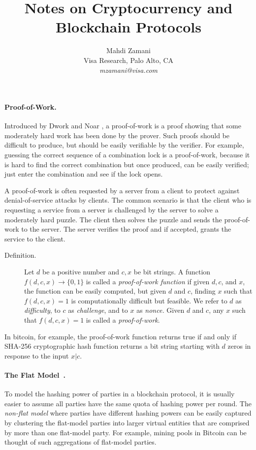 \documentclass[11pt]{article}
\theoremstyle{mytheoremstyle}
\begin{document}
\title{Notes on Cryptocurrency and Blockchain Protocols}

\author{Mahdi Zamani\\ Visa Research, Palo Alto, CA \\ \textit{mzamani@visa.com}}
\date{}

\maketitle

\paragraph{Proof-of-Work.} Introduced by Dwork and Noar \cite{dwork1993}, a proof-of-work is
a proof showing that some moderately hard work has been done by the
prover. Such proofs should be difficult to produce, but should be
easily verifiable by the verifier. For example, guessing the correct
sequence of a combination lock is a proof-of-work, because it is hard
to find the correct combination but once produced, can be easily verified;
just enter the combination and see if the lock opens.

A proof-of-work is often requested by a server from a client to protect
against denial-of-service attacks by clients. The common scenario
is that the client who is requesting a service from a server is challenged
by the server to solve a moderately hard puzzle. The client then solves
the puzzle and sends the proof-of-work to the server. The server verifies
the proof and if accepted, grants the service to the client.
\begin{description}
	\item [{Definition.}] Let $d$ be a positive number and $c,x$ be bit strings.
	A function $f(d,c,x)\to\{0,1\}$ is called a \emph{proof-of-work function}
	if given $d,c$, and $x$, the function can be easily computed, but
	given $d$ and $c$, finding $x$ such that $f(d,c,x)=1$ is computationally
	difficult but feasible. We refer to $d$ as \emph{difficulty}, to
	$c$ as \emph{challenge}, and to $x$ as \emph{nonce.} Given $d$
	and $c$, any $x$ such that $f(d,c,x)=1$ is called a \emph{proof-of-work}.
\end{description}
In bitcoin, for example, the proof-of-work function returns true if
and only if SHA-256 cryptographic hash function returns a bit string
starting with $d$ zeros in response to the input $x|c$.

\paragraph{The Flat Model~\cite{garay2015bitcoin}.} To model the hashing power of parties in a blockchain protocol, it is usually easier to assume all parties have the same quota of hashing power per round. The \emph{non-flat model} where parties have different hashing powers can be easily captured by clustering the flat-model parties into larger virtual entities that are comprised by more than one flat-model party. For example, mining pools in Bitcoin can be thought of such aggregations of flat-model parties.
\end{document}
